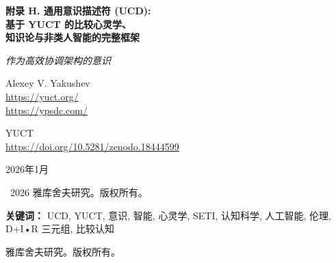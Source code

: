 \documentclass[11pt,a4paper]{article}
\DeclareRobustCommand{\alD}{\texorpdfstring{\ensuremath{\alpha_{\mathrm{D}}}}{alpha_D}}
\DeclareRobustCommand{\beI}{\texorpdfstring{\ensuremath{\beta_{\mathrm{I}}}}{beta_I}}
\DeclareRobustCommand{\gaR}{\texorpdfstring{\ensuremath{\gamma_{\mathrm{R}}}}{gamma_R}}
\newcommand{\eff}{\mathrm{eff}}
\newcommand{\Ke}{K_{\eff}}
\begin{document}
	
	\begin{titlepage}
		\begin{center}
			\vspace*{0cm}
			
			\Huge\textbf{附录 H. 通用意识描述符 (UCD):\\ 基于 YUCT 的比较心灵学、\\ 知识论与非类人智能的完整框架}
			
			\vspace{1cm}
			
			\small\textit{作为高效协调架构的意识}
			
			\vspace{1cm}
			\Large
			Alexey V. Yakushev\\
			
			\url{https://yuct.org/}\\
			\url{https://ypsdc.com/}
			
			\vspace{2cm}
			\large YUCT \\ 
			\url{https://doi.org/10.5281/zenodo.18444599}\\
			\vspace{1cm}
			
			\vspace{0cm}
			\large
			2026年1月
			
			\vspace{6cm}
			\textcopyright~2026 雅库舍夫研究。版权所有。
			
			\newpage
			
			\begin{abstract}
				\noindent
				本文提出将通用意识描述符 (UCD) 与雅库舍夫统一协调理论 (YUCT) 相结合的完整统一意识-知识框架。基于意识/智能/心智是一种高效 (\(\Ke \gg 1\)) 协调架构这一根本洞见，我们发展了：(1) D+I\(\cdot\)R 三元组作为任何认知主体基本分解的完整数学表述；(2) 用于跨物种和跨基质定量比较的三个谱参数 (\alD, \beI, \gaR)；(3) 作为协调信息处理的知识论；(4) 用于测量生物、人工和地外系统中意识的详细实验方案；(5) 对天体物理学 SETI 2.0 搜索的具体预测；(6) 与现有意识理论 (IIT、全局工作空间、预测加工) 的比较；(7) 在医学、AI 安全和网络安全中的伦理意涵和实际应用；(8) 完整的数学证明，包括认知层级定理、协调效率上限和计算复杂性界限。该框架解决了长期存在的哲学问题，同时在 15 个以上实验领域提供了可检验的预测。
			\end{abstract}
			
			\vspace{0cm}
			
			\noindent
			\small\textbf{关键词：} UCD, YUCT, 意识, 智能, 心灵学, SETI, 认知科学, 人工智能, 伦理, D+I•R 三元组, 比较认知
			
			\vspace{0.5cm}
			
			\noindent
			 雅库舍夫研究。版权所有。
		\end{center}
	\end{titlepage}
	
\end{document}
